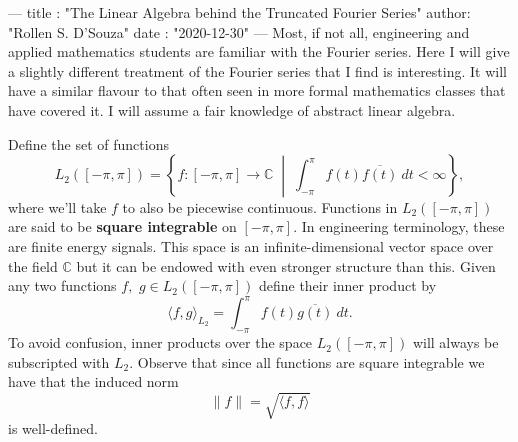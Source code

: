 ---
title :   "The Linear Algebra behind the Truncated Fourier Series"
author:   "Rollen S. D'Souza"
date  :   "2020-12-30"
---
Most, if not all, engineering and applied mathematics students are familiar with the Fourier series.
Here I will give a slightly different treatment of the Fourier series that I find is interesting.
It will have a similar flavour to that often seen in more formal mathematics classes that have covered it.
I will assume a fair knowledge of abstract linear algebra.

Define the set of functions
\[
  L_2([-\pi, \pi])
    =
      \left\{
        f: [-\pi, \pi] \to \mathbb{C}
        \;\middle|\;
        \int_{-\pi}^{\pi} f(t) \overline{f(t)} ~dt < \infty
      \right\},
\]
where we'll take \(f\) to also be piecewise continuous.
Functions in \(L_2([-\pi, \pi])\) are said to be \textbf{square integrable} on \([-\pi, \pi].\)
In engineering terminology, these are finite energy signals.
This space is an infinite-dimensional vector space over the field \(\mathbb{C}\) but it can be endowed with even stronger structure than this.
Given any two functions \(f,\) \(g\in L_2([-\pi, \pi])\) define their inner product by
\[
  \langle f, g \rangle_{L_2} = \int_{-\pi}^{\pi} f(t) \overline{g(t)}~dt.
\]
To avoid confusion, inner products over the space \(L_2([-\pi, \pi])\) will always be subscripted with \(L_2.\)
Observe that since all functions are square integrable we have that the induced norm
\[
  \|f\| = \sqrt{\langle f, f \rangle}
\]
is well-defined.

